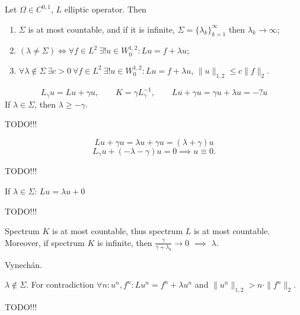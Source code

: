 \documentclass[12pt]{article}					%
\begin{document}
\begin{veta}
	Let $Ω \in C^{0, 1}$, $L$ elliptic operator. Then
	\begin{enumerate}
		\item $Σ$ is at most countable, and if it is infinite, $Σ = \{λ_k\}_{k=1}^∞$ then $λ_k \rightarrow ∞$;
		\item $(λ ≠ Σ) \Leftrightarrow \forall f \in L^2\ \exists! u \in W^{1, 2}_0: Lu = f + λu$;
		\item $\forall λ \notin Σ\ \exists c > 0\ \forall f \in L^2\ \exists! u \in W^{1, 2}_0: Lu = f+λu$, $\|u\|_{1, 2} ≤ c\|f\|_2$.
	\end{enumerate}

	\begin{dukazin}[1.]
		$$ L_γ u = Lu + γu, \qquad K = γL^{-1}_γ, \qquad Lu + γu = γu + λu = -? u $$
		If $λ \in Σ$, then $λ ≥ -γ$.

		TODO!!!

		$$ Lu + γu = λu + γu = (λ + γ)u $$
		$$ L_γu + (-λ - γ)u = 0 \implies u ≡ 0. $$

		TODO!!!

		If $λ \in Σ$: $Lu = λu + 0$

		TODO!!!

		Spectrum $K$ is at most countable, thus spectrum $L$ is at most countable. Moreover, if spectrum $K$ is infinite, then $\frac{γ}{γ + λ_k} \rightarrow 0$ $\implies$ $λ$.
	\end{dukazin}

	\begin{dukazin}[2.]
		Vynechán.
	\end{dukazin}

	\begin{dukazin}[3.]
		$λ \notin Σ$. For contradiction $\forall n: u^n, f^n: Lu^n = f^n + λu^n$ and $\|u^n\|_{1, 2} > n·\|f^n\|_2$.
	\end{dukazin}
\end{veta}

TODO!!!
\end{document}
